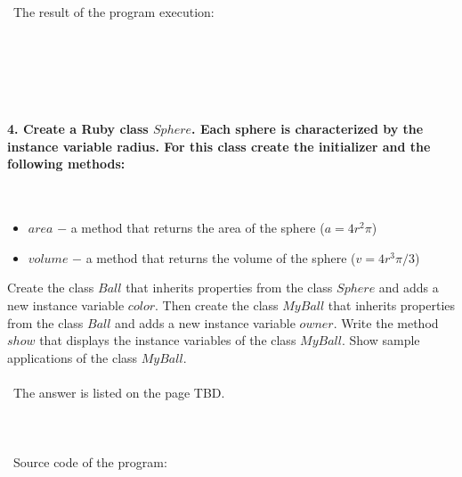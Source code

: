 \documentclass{article}
\begin{document}
\paragraph{}\
	The result of the program execution:
	
\begin{verbatim} 

\end{verbatim}


\paragraph{}\
\paragraph{}\



\paragraph{4. Create a Ruby class \(Sphere\). Each sphere is characterized by the instance variable radius. For this class create the initializer and the following methods: }\

	\begin{itemize}
		\item \(area\) \(-\) a method that returns the area of the sphere (\(a = 4r^2\pi\))
		\item \(volume\) \(-\) a method that returns the volume of the sphere (\(v = 4r^3\pi / 3\))
	\end{itemize}
	
	Create the class \(Ball\) that inherits properties from the class \(Sphere\) and adds a new instance variable \(color\). Then create the class \(MyBall\) that inherits properties from the class \(Ball\) and adds a new instance variable \(owner\). Write the method \(show\) that displays the instance variables of the class \(MyBall\). Show sample applications of the class \(MyBall\).

\paragraph{}\
	The answer is listed on the page TBD.
	
\paragraph{}\
\paragraph{}\
Source code of the program:
\end{document}

